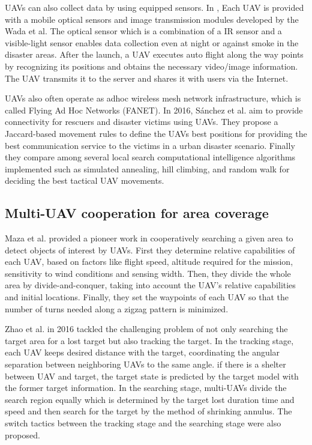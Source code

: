 \documentclass{ieeeaccess}
\begin{document}
UAVs can also collect data by using equipped sensors. In \cite{Wada2015}, Each UAV is provided with a mobile optical sensors and image transmission modules developed by the Wada et al. The optical sensor which is a combination of a IR sensor and a visible-light sensor enables data collection even at night or against smoke in the disaster areas.
After the launch, a UAV executes auto flight along the way points by recognizing its positions and  obtains the necessary video/image information. The UAV transmits it to the server and shares it with users via the Internet.

UAVs also often operate as adhoc wireless mesh network infrastructure, which is called Flying Ad Hoc Networks (FANET)\cite{Bekmezci2013}.
In 2016, S\'anchez et al. aim to provide connectivity for rescuers and disaster victims using UAVs\cite{Garcia2016}.
They propose a Jaccard-based movement rules to define the UAVs best positions for providing the best communication service to the victims in a urban disaster scenario.
Finally they compare among several local search computational intelligence algorithms implemented such as simulated annealing, hill climbing, and random walk for deciding the best tactical UAV movements.

\subsection{Multi-UAV cooperation for area coverage}\label{cover}
Maza et al. provided a pioneer work in cooperatively searching a given area to detect objects of interest by UAVs\cite{Maza2007}.
First they determine relative capabilities of each UAV, based on factors like flight speed, altitude required for the mission, sensitivity to wind conditions and sensing width.
Then, they divide the whole area by divide-and-conquer, taking into account the UAV's relative capabilities and initial locations.
Finally, they set the waypoints of each UAV so that the number of turns needed along a zigzag pattern is minimized.

Zhao et al. in 2016 tackled the challenging problem of not only searching the target area for a lost target but also tracking the target\cite{chang2016}.
In the tracking stage, each UAV keeps desired distance with the target, coordinating the angular separation between neighboring UAVs to the same angle.
if there is a shelter between UAV and target, the target state is predicted by the target model with the former target information.  
In the searching stage, multi-UAVs divide the search region equally which is determined by the target lost duration time and speed and then search for the target by the method of shrinking annulus.
The switch tactics between the tracking stage and the searching stage were also proposed. 
\end{document}
